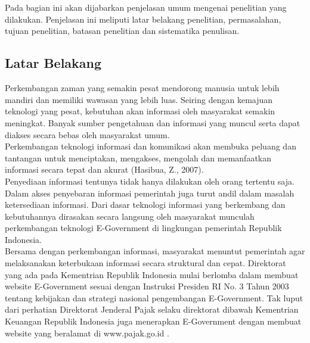 \chapter{\babSatu}

Pada bagian ini akan dijabarkan penjelasan umum mengenai penelitian yang dilakukan. Penjelasan ini meliputi latar belakang penelitian, permasalahan, tujuan penelitian, batasan penelitian dan sistematika penulisan.

\section{Latar Belakang}
Perkembangan zaman yang semakin pesat mendorong manusia untuk lebih mandiri dan memiliki wawasan yang lebih luas. Seiring dengan kemajuan teknologi yang pesat, kebutuhan akan informasi oleh masyarakat semakin meningkat. Banyak sumber pengetahuan dan informasi yang muncul serta dapat diakses secara bebas oleh masyarakat umum.
\newline\\
Perkembangan teknologi informasi dan komunikasi akan membuka peluang dan tantangan untuk menciptakan, mengakses, mengolah dan memanfaatkan informasi secara tepat dan akurat (Hasibua, Z., 2007).  
\newline\\
Penyediaan informasi tentunya tidak hanya dilakukan oleh orang tertentu saja. Dalam akses penyebaran informasi pemerintah juga turut andil dalam masalah ketersediaan informasi. Dari dasar teknologi informasi yang berkembang dan kebutuhannya dirasakan secara langsung oleh masyarakat munculah perkembangan teknologi E-Government di lingkungan pemerintah Republik Indonesia. 
\newline\\
Bersama dengan perkembangan informasi, masyarakat menuntut pemerintah agar melaksanakan keterbukaan informasi secara struktural dan cepat. Direktorat yang ada pada Kementrian Republik Indonesia mulai berlomba dalam membuat website E-Government sesuai dengan Instruksi Presiden RI No. 3 Tahun 2003 tentang kebijakan dan strategi nasional pengembangan E-Government. Tak luput dari perhatian Direktorat Jenderal Pajak selaku direktorat dibawah Kementrian Keuangan Republik Indonesia juga menerapkan E-Government dengan membuat website yang beralamat di www.pajak.go.id . 
